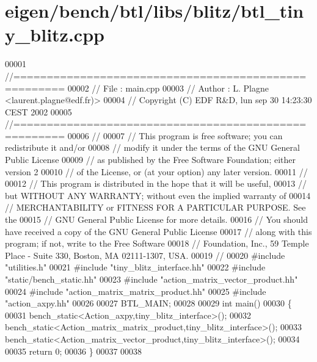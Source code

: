\hypertarget{eigen_2bench_2btl_2libs_2blitz_2btl__tiny__blitz_8cpp_source}{}\section{eigen/bench/btl/libs/blitz/btl\+\_\+tiny\+\_\+blitz.cpp}
\label{eigen_2bench_2btl_2libs_2blitz_2btl__tiny__blitz_8cpp_source}

\begin{DoxyCode}
00001 \textcolor{comment}{//=====================================================}
00002 \textcolor{comment}{// File   :  main.cpp}
00003 \textcolor{comment}{// Author :  L. Plagne <laurent.plagne@edf.fr)>}
00004 \textcolor{comment}{// Copyright (C) EDF R&D,  lun sep 30 14:23:30 CEST 2002}
00005 \textcolor{comment}{//=====================================================}
00006 \textcolor{comment}{//}
00007 \textcolor{comment}{// This program is free software; you can redistribute it and/or}
00008 \textcolor{comment}{// modify it under the terms of the GNU General Public License}
00009 \textcolor{comment}{// as published by the Free Software Foundation; either version 2}
00010 \textcolor{comment}{// of the License, or (at your option) any later version.}
00011 \textcolor{comment}{//}
00012 \textcolor{comment}{// This program is distributed in the hope that it will be useful,}
00013 \textcolor{comment}{// but WITHOUT ANY WARRANTY; without even the implied warranty of}
00014 \textcolor{comment}{// MERCHANTABILITY or FITNESS FOR A PARTICULAR PURPOSE.  See the}
00015 \textcolor{comment}{// GNU General Public License for more details.}
00016 \textcolor{comment}{// You should have received a copy of the GNU General Public License}
00017 \textcolor{comment}{// along with this program; if not, write to the Free Software}
00018 \textcolor{comment}{// Foundation, Inc., 59 Temple Place - Suite 330, Boston, MA  02111-1307, USA.}
00019 \textcolor{comment}{//}
00020 \textcolor{preprocessor}{#include "utilities.h"}
00021 \textcolor{preprocessor}{#include "tiny\_blitz\_interface.hh"}
00022 \textcolor{preprocessor}{#include "static/bench\_static.hh"}
00023 \textcolor{preprocessor}{#include "action\_matrix\_vector\_product.hh"}
00024 \textcolor{preprocessor}{#include "action\_matrix\_matrix\_product.hh"}
00025 \textcolor{preprocessor}{#include "action\_axpy.hh"}
00026 
00027 BTL\_MAIN;
00028 
00029 \textcolor{keywordtype}{int} main()
00030 \{
00031   bench\_static<Action\_axpy,tiny\_blitz\_interface>();
00032   bench\_static<Action\_matrix\_matrix\_product,tiny\_blitz\_interface>();
00033   bench\_static<Action\_matrix\_vector\_product,tiny\_blitz\_interface>();
00034 
00035   \textcolor{keywordflow}{return} 0;
00036 \}
00037 
00038 
\end{DoxyCode}
